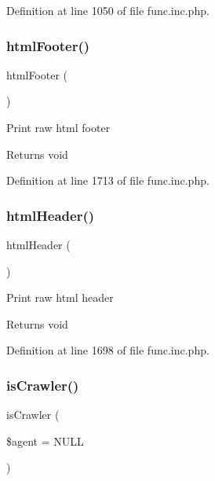 Definition at line 1050 of file func.\+inc.\+php.

\mbox{\label{func_8inc_8php_a2f21eda8628bd378f56529cb680006b0}} 
\subsubsection{\texorpdfstring{html\+Footer()}{htmlFooter()}}
{\footnotesize\ttfamily html\+Footer (\begin{DoxyParamCaption}{ }\end{DoxyParamCaption})}

Print raw html footer

\begin{DoxyReturn}{Returns}
void 
\end{DoxyReturn}


Definition at line 1713 of file func.\+inc.\+php.

\mbox{\label{func_8inc_8php_adf603cdce37b515631c58bb3acffa614}} 
\subsubsection{\texorpdfstring{html\+Header()}{htmlHeader()}}
{\footnotesize\ttfamily html\+Header (\begin{DoxyParamCaption}{ }\end{DoxyParamCaption})}

Print raw html header

\begin{DoxyReturn}{Returns}
void 
\end{DoxyReturn}


Definition at line 1698 of file func.\+inc.\+php.

\mbox{\label{func_8inc_8php_a490ffbd4821da1995c76c381553d5b3d}} 
\subsubsection{\texorpdfstring{is\+Crawler()}{isCrawler()}}
{\footnotesize\ttfamily is\+Crawler (\begin{DoxyParamCaption}\item[{}]{\$agent = {\ttfamily NULL} }\end{DoxyParamCaption})}

